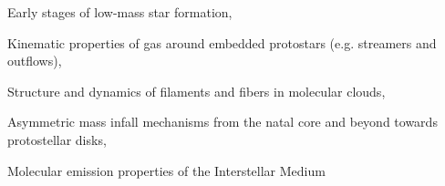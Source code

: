 \vspace{8pt}
\begin{cvitems} %
	  \item{Early stages of low-mass star formation,}
      \item{Kinematic properties of gas around embedded protostars (e.g. streamers and outflows),}
      \item {Structure and dynamics of filaments and fibers in molecular clouds,}
       \item {Asymmetric mass infall mechanisms from the natal core and beyond towards protostellar disks,}
       \item {Molecular emission properties of the Interstellar Medium}
      
\end{cvitems}
\vspace{8pt}